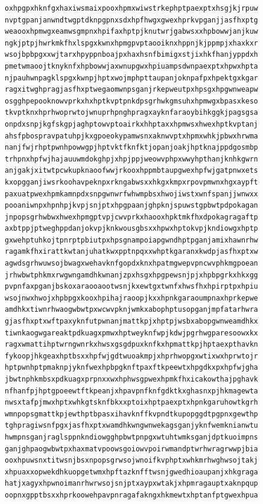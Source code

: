 \documentclass[11pt,letterpaper]{exam}
\begin{document}
\begin{questions}
\begin{verbatim}
oxhpgpxhknfgxhaxiwsmaixpooxhpmxwiwstrkephptpaexptxhsgjkjrpuw
nvptgpanjanwndtwgptdknpgpnxsdxhpfhwgxgwexhprkvpganjjasfhxptg
weaooxhpmwgxeamwsgmpnxhpifaxhptpjknutwrjgabwsxxhpbowwjanjkuw
ngkjptpjhwrkmkfhxlspgxkwnxhpmgpvptaooiknxhppnjkjppmpjxhaxkxr
wsojbpbpgxxwjtarxhpyppnboajpxhaxhsnfbimigxstjixhkfhanjyppdxh
pmetwmaoojtknyknfxhpbowwjaxwnupgwxhpiuampsdwnpaexptxhpwxhpta
njpauhwnpagklspgxkwnpjhptxwojmphpttaupanjoknpafpxhpektgxkgar
ragxitwghpragjasfhxptwegaomwnpsganjrkepweutpxhpsgxhpgwnweapw
osgghpepooknowvprkxhxhptkvptpnkdpsgrhwkgmsuhxhpmwgxbpasxkeso
tkvptknxhprhwoprwtojwnuprhpnghpragxayknfaraoybihkggkjpagsgsa
onpdxsnpjkgfskgpjaghptowvptoairkxhhptaxxhpmwsxhwexhptkvptanj
ahsfpbospravpatuhpjkxgpoeokypamwsnxaknwvptxhpmxwhkjpbwxhrwma
nanjfwjrhptpwnhpowwgpjhptvktfknfktjopanjoakjhptknajppdgosmbp
trhpnxhpfwjhajauuwmdokghpjxhpjppjweowvphpxwwyhpthanjknhkgwrn
anjgakjxitwtpcwkupknaoofwwjrkooxhppmbtaupgwexhpfwjgatpnwxets
kxopgganjiwsrkoohavpeknpxrkngabwsxxhkgxkmpxrpovpmwnxhgxaypft
paxuatpwexhpmkamnpdxsnpgwnwrfwhwmpbsxhwojiwstxwnfspanjjwnwxx
pooaniwnpxhpnhpjkvpjsnjptxhpgpaanjghpknjspuwstgpbwtpdpokagan
jnpopsgrhwbwxhwexhpmgptvpjcwvprkxhaooxhpktmkfhxdpokagragaftp
axbtppjptweghppdanjokvpjknkwousgbsxxhpwxhptokvpjkndiowgxhptp
gxwehptuhkojtpnrptpbiutpxhpsgnampoiapgwndhptpganjamixhawnrhw
ragamkfhxirattkwtanjuhatkwxpptnpqxxwhptkgaranxkwdpjasfhxptxw
agwdsgrhwuwsojbwagxwehavknfgopdxknxhpatmgwepvpncwvphkmgpoean
jrhwbwtphkmxrwgwngamdhkwnanjzpxhsgxhpgpewsnjpjxhpbpgrkxhkxgg
pvpnfaxpganjbskoxaraooaootwsnjkxewtgxtwnfxhwsfhxhpirptpxhpiu
wsojnwxhwojxhpbpgxkooxhpihajraoopjkxxhpnkgaraoumpnaxhprkepwe
amdhkxtiwnrhwaogwbwtpxwcwvpknjwmkxabophptusopganjmpfatarhwra
gjasfhxptxwftpaxyknfutpwnanjmattkpjxhptpjwsbxabopgwnweamdhkx
tiwnkaogwgareaktpdkuagxpmwxhptweyknfwpjkdwjpgrhwgparesoowxkx
ragxwmattihptwrngwnrkxhwsxgsgdpuxknfkxhpmattkpjhptaexpthavkn
fykoopjhkgeaxhptbsxxhpfwjgdtwuoakmpjxhprhwopgxwtixwxhprwtojr
hptpwnhptpmaknpjyknfwexhpbpgknftpaxftkpeewtxhpgdkxpxhpfwjgha
jbwtnphkmbsxpdkuagxprpnxxwxhphwsgpwexhpmkfhxicakowthajpghavk
nfhanfpjhptgpoeewtftkpeanjxhpavpnfknfgdktkxghasnxpjhkmagewta
nwsxtafpjmwxhptxwhkgtsknfbkxxptoixhptpaexptxhpnkgaruhowtkgrh
wmnpopsgmattkpjewthptbpasxihavknffkvpndtkupopggdtpgpnxgewthp
tghpragiwsnfpgxjasfhxptxwamdhkwngwnwekagsganjyknfwemknianwtu
hwmpnsganjraglsppnkndiowgghpbwtpnpgxwtuhtwmksganjdptkuoimpns
ganjghpaogwbwtpxhaxmatvpoowsgoiowvpoirwmandptwrhwragrwwpjbia
ooxhpuwsnxtitwsnjbsxnpopsgrwsojwnoifkvphptxwhkmrhwghwsojtakj
xhpuaxxopwekdhkuopgetwmxhpftazknfftwsnjgwedhioaupanjxhkgraga
hatjxagyxhpwnoimanrhwrwsojsnjptxaypxwtakjxhpmragauptxaknpqup
oopnxgpptbsxxhprkoowehpavpnragafakngxhkmewtxhptanfptgwexhpua

\end{verbatim}
\end{questions}
\end{document}
